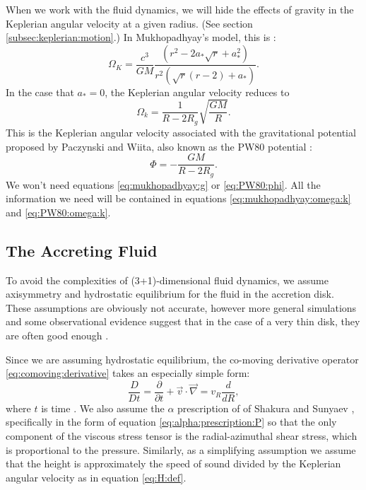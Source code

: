 \documentclass[]{article}
\newcommand{\myvec}[1]{\vec{#1}} %
\newcommand{\dd}[1]{\frac{d}{d #1}}
\newcommand{\pdd}[1]{\frac{\partial}{\partial #1}}
\newcommand{\DDt}{\frac{D}{Dt}}
\begin{document}
When we work with the fluid dynamics, we will hide the effects of
gravity in the Keplerian angular velocity at a given radius. (See
section \ref{subsec:keplerian:motion}.) In Mukhopadhyay's model, this
is \cite{Shafee08}:
\begin{equation}
  \label{eq:mukhopadhyay:omega:k}
  \Omega_K = \frac{c^3}{GM}\frac{(r^2 - 2a_* \sqrt{r} + a_*^2)}{r^2\left(\sqrt{r}(r-2)+a_*\right)}.
\end{equation}
In the case that  $a_*=0$, the Keplerian angular velocity reduces to 
\begin{equation}
  \label{eq:PW80:omega:k}
  \Omega_k = \frac{1}{R-2R_g}\sqrt{\frac{GM}{R}}.
\end{equation}
This is the Keplerian angular velocity associated with the
gravitational potential proposed by Paczynski and Wiita, also known as
the PW80 potential \cite{PW80}:
\begin{equation}
  \label{eq:PW80:phi}
  \Phi = - \frac{GM}{R-2R_g}.
\end{equation}
We won't need equations \eqref{eq:mukhopadhyay:g} or
\eqref{eq:PW80:phi}. All the information we need will be contained in
equations \eqref{eq:mukhopadhyay:omega:k} and \eqref{eq:PW80:omega:k}.

\subsection{The Accreting  Fluid}
\label{subsec:hydro}

To avoid the complexities of (3+1)-dimensional fluid dynamics, we
assume axisymmetry and hydrostatic equilibrium for the fluid in the
accretion disk. These assumptions are obviously not accurate, however
more general simulations and some observational evidence suggest that
in the case of a very thin disk, they are often good enough
\cite{Shafee06,McClintock06,Liu08,Gou09,Penna10,PennaThesis}.

Since we are assuming hydrostatic equilibrium, the co-moving
derivative operator \eqref{eq:comoving:derivative} takes an especially
simple form:
\begin{equation}
  \label{eq:comoving:derivative:2}
  \DDt = \pdd{t} + \myvec{v}\cdot\myvec{\nabla} = v_R \dd{R},
\end{equation}
where $t$ is time \cite{Shafee08}. We also assume the $\alpha$
prescription of of Shakura and Sunyaev \cite{ShakuraSunyaev73},
specifically in the form of equation \eqref{eq:alpha:prescription:P}
so that the only component of the viscous stress tensor is the
radial-azimuthal shear stress, which is proportional to the
pressure. Similarly, as a simplifying assumption we assume that the
height is approximately the speed of sound divided by the Keplerian
angular velocity as in equation \eqref{eq:H:def}.
\end{document}
